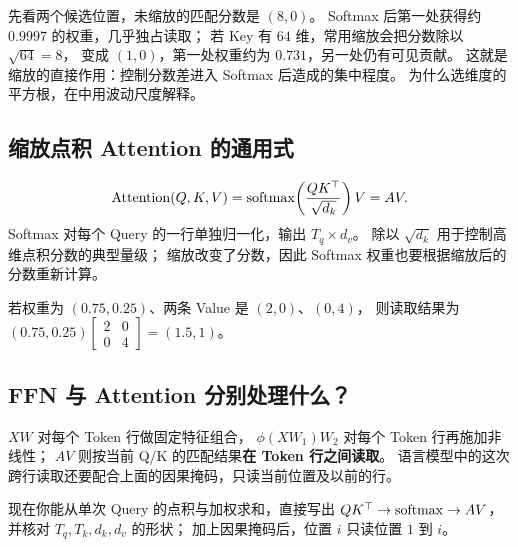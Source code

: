 先看两个候选位置，未缩放的匹配分数是 $(8,0)$。
Softmax 后第一处获得约 $0.9997$ 的权重，几乎独占读取；
若 Key 有 $64$ 维，常用缩放会把分数除以 $\sqrt{64}=8$，
变成 $(1,0)$，第一处权重约为 $0.731$，另一处仍有可见贡献。
这就是缩放的直接作用：控制分数差进入 Softmax 后造成的集中程度。
为什么选维度的平方根，在中用波动尺度解释。

\subsection{缩放点积 Attention 的通用式}
\begin{equation}
\operatorname{Attention}(Q,K,V)
=\operatorname{softmax}\!\left(\frac{QK^\top}{\sqrt{d_k}}\right)V=AV.
\label{eq:attention-transformer}
\end{equation}
\label{eq:multi-query-attention}
Softmax 对每个 Query 的一行单独归一化，输出 $T_q\times d_v$。
除以 $\sqrt{d_k}$ 用于控制高维点积分数的典型量级；
缩放改变了分数，因此 Softmax 权重也要根据缩放后的分数重新计算。

\begin{example}
若权重为 $(0.75,0.25)$、两条 Value 是 $(2,0)$、$(0,4)$，
则读取结果为
$(0.75,0.25)\begin{bmatrix}2&0\\0&4\end{bmatrix}=(1.5,1)$。
\end{example}

\subsection{FFN 与 Attention 分别处理什么？}
$XW$ 对每个 Token 行做固定特征组合，
$\phi(XW_1)W_2$ 对每个 Token 行再施加非线性；
$AV$ 则按当前 Q/K 的匹配结果\textbf{在 Token 行之间读取}。
语言模型中的这次跨行读取还要配合上面的因果掩码，只读当前位置及以前的行。



\par\smallskip
现在你能从单次 Query 的点积与加权求和，直接写出
$QK^\top\to\operatorname{softmax}\to AV$，并核对 $T_q,T_k,d_k,d_v$ 的形状；
加上因果掩码后，位置 $i$ 只读位置 $1$ 到 $i$。
